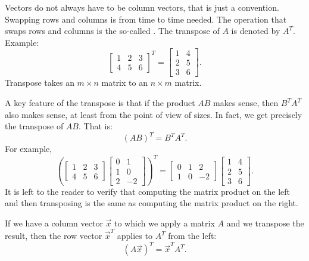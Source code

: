Vectors do not always have to be column vectors,
that is just a convention.
Swapping rows and columns is from time to time needed.
The operation that swaps rows and columns is the so-called
\emph{}.
The transpose of $A$ is denoted by $A^T$.  Example:
\begin{equation*}
\begin{bmatrix}
1 & 2 & 3 \\
4 & 5 & 6
\end{bmatrix}^T =
\begin{bmatrix}
1 & 4 \\
2 & 5 \\
3 & 6 
\end{bmatrix} .
\end{equation*}
Transpose takes an $m \times n$ matrix to an $n \times m$ matrix.

A key feature of the transpose is that if the product $AB$ makes sense,
then $B^TA^T$ also makes sense, at least from the point of view of sizes.
In fact, we get precisely the transpose of $AB$.  That is:
\begin{equation*}
{(AB)}^T = B^TA^T .
\end{equation*}
For example,
\begin{equation*}
{\left(
\begin{bmatrix}
1 & 2 & 3 \\
4 & 5 & 6
\end{bmatrix}
\begin{bmatrix}
0 & 1 \\
1 & 0 \\
2 & -2
\end{bmatrix}
\right)}^T =
\begin{bmatrix}
0 & 1 & 2 \\
1 & 0 & -2
\end{bmatrix}
\begin{bmatrix}
1 & 4 \\
2 & 5 \\
3 & 6 
\end{bmatrix} .
\end{equation*}
It is left to the reader to verify that computing the matrix product on the
left and then transposing is the same as computing the matrix product on the
right.

If we have a column vector $\vec{x}$ to which we apply a matrix $A$
and we transpose the result,
then the row vector $\vec{x}^T$ applies to $A^T$ from the left:
\begin{equation*}
{(A\vec{x})}^T = \vec{x}^TA^T .
\end{equation*}

